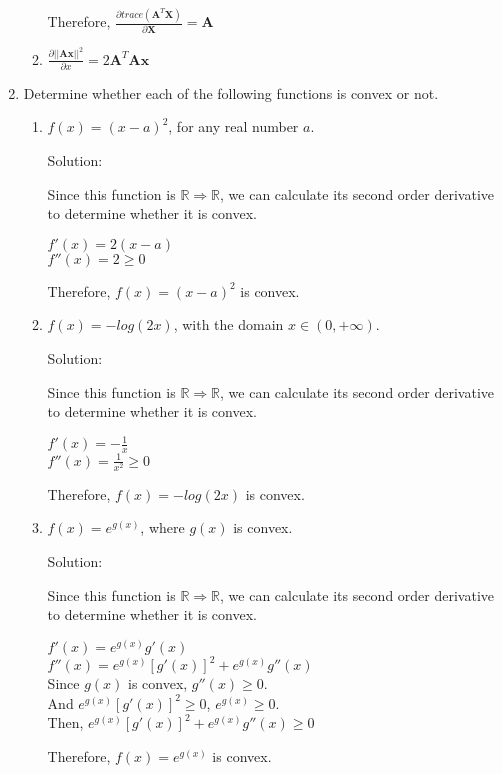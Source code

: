 \documentclass[12pt]{article}
\newcommand{\solu}{{\color{blue} Solution:}}
\begin{document}
\begin{enumerate}
\begin{enumerate}
            Therefore, $\frac{\partial trace(\pmb{A}^T\pmb{X})}{\partial \pmb{X}} = \pmb{A}$ 
            
            \item $\frac{\partial ||\pmb{Ax}||^2}{\partial x} = 2\pmb{A}^T \pmb{A}\pmb{x}$
              
          \end{enumerate}

          \item Determine whether each of the following functions is convex or not.
          \begin{enumerate}
            \item $f(x) = (x-a)^2$, for any real number $a$.
              
            \solu

            Since this function is $\mathbb{R} \Rightarrow \mathbb{R}$, we can calculate its second order derivative to determine whether it is convex.

            $f'(x) = 2(x - a)$ \\
            $f''(x) = 2 \ge 0$

            Therefore, $f(x) = (x-a)^2$ is convex.

            \item $f(x) = -log(2x)$, with the domain $x \in (0,+\infty)$.
              
            \solu

            Since this function is $\mathbb{R} \Rightarrow \mathbb{R}$, we can calculate its second order derivative to determine whether it is convex.

            $f'(x) = -\frac{1}{x}$\\
            $f''(x) = \frac{1}{x^2} \ge 0$

            Therefore, $f(x) = -log(2x)$ is convex.

            \item $f(x) = e^{g(x)}$, where $g(x)$ is convex.
              
            \solu
            
            Since this function is $\mathbb{R} \Rightarrow \mathbb{R}$, we can calculate its second order derivative to determine whether it is convex.

            $f'(x) = e^{g(x)}g'(x)$\\
            $f''(x) = e^{g(x)}[g'(x)]^2 + e^{g(x)}g''(x)$\\
            Since $g(x)$ is convex, $g''(x) \ge 0$.\\
            And $e^{g(x)}[g'(x)]^2 \ge 0$, $e^{g(x)} \ge 0$.\\
            Then, $e^{g(x)}[g'(x)]^2 + e^{g(x)}g''(x) \ge 0$
            
            Therefore, $f(x) = e^{g(x)}$ is convex.
              
          \end{enumerate}
\end{enumerate}
\end{document}
